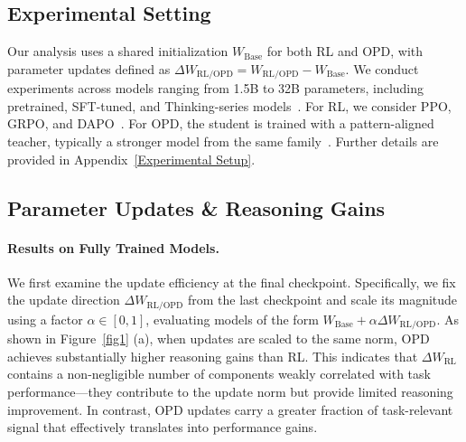 \documentclass{article}
\begin{document}
\subsection{Experimental Setting}
\label{Experimental Setting}
Our analysis uses a shared initialization $W_{\mathrm{Base}}$ for both RL and OPD, with parameter updates defined as $\Delta W_{\mathrm{RL/OPD}} = W_{\mathrm{RL/OPD}} - W_{\mathrm{Base}}$. We conduct experiments across models ranging from 1.5B to 32B parameters, including pretrained, SFT-tuned, and Thinking-series models~\citep{qwen2025qwen25technicalreport,zhang2025instructiontuninglargelanguage,yang2025qwen3technicalreport}. For RL, we consider PPO, GRPO, and DAPO~\citep{yu2025dapoopensourcellmreinforcement}. For OPD, the student is trained with a pattern-aligned teacher, typically a stronger model from the same family~\citep{li2026rethinking}. Further details are provided in Appendix~\ref{Experimental Setup}.

\subsection{Parameter Updates \& Reasoning Gains}
\label{Parameter Updates and Reasoning Gains}

\paragraph{Results on Fully Trained Models.}
We first examine the update efficiency at the final checkpoint. Specifically, we fix the update direction $\Delta W_{\mathrm{RL/OPD}}$ from the last checkpoint and scale its magnitude using a factor $\alpha \in [0,1]$, evaluating models of the form $W_{\mathrm{Base}} + \alpha \Delta W_{\mathrm{RL/OPD}}$. As shown in Figure~\ref{fig1} (a), when updates are scaled to the same norm, OPD achieves substantially higher reasoning gains than RL. This indicates that $\Delta W_{\mathrm{RL}}$ contains a non-negligible number of components weakly correlated with task performance—they contribute to the update norm but provide limited reasoning improvement. In contrast, OPD updates carry a greater fraction of task-relevant signal that effectively translates into performance gains.
\end{document}
